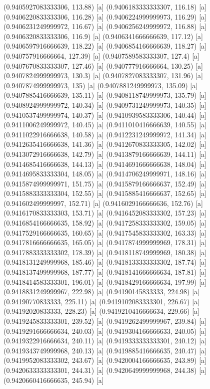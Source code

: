 {{{(0.9405927083333306, 113.88) [a] 
(0.9406183333333307, 116.18) [a] 
(0.9406220833333306, 116.28) [a] 
(0.9406224999999973, 116.29) [a] 
(0.9406231249999972, 116.67) [a] 
(0.9406256249999972, 116.88) [a] 
(0.9406320833333306, 116.9) [a] 
(0.9406341666666639, 117.12) [a] 
(0.9406597916666639, 118.22) [a] 
(0.9406854166666639, 118.27) [a] 
(0.940757916666664, 127.39) [a] 
(0.9407589583333307, 127.4) [a] 
(0.9407670833333307, 127.46) [a] 
(0.940777916666664, 130.25) [a] 
(0.9407824999999973, 130.3) [a] 
(0.9407827083333307, 131.96) [a] 
(0.9407874999999973, 135) [a] 
(0.9407881249999973, 135.09) [a] 
(0.9407885416666639, 135.11) [a] 
(0.9408118749999973, 135.79) [a] 
(0.9408924999999972, 140.34) [a] 
(0.9409731249999973, 140.35) [a] 
(0.9410537499999974, 140.37) [a] 
(0.9410939583333306, 140.44) [a] 
(0.9411006249999972, 140.45) [a] 
(0.9411010416666639, 140.55) [a] 
(0.9411022916666638, 140.58) [a] 
(0.9412231249999972, 141.34) [a] 
(0.9412635416666638, 141.36) [a] 
(0.9412670833333305, 142.02) [a] 
(0.9413072916666638, 142.79) [a] 
(0.9413879166666639, 144.11) [a] 
(0.9414685416666638, 144.13) [a] 
(0.9414691666666638, 148.04) [a] 
(0.9414695833333304, 148.05) [a] 
(0.9414706249999971, 148.16) [a] 
(0.9415874999999971, 151.75) [a] 
(0.9415879166666637, 152.49) [a] 
(0.9415883333333304, 152.55) [a] 
(0.9415885416666637, 152.65) [a] 
(0.941602499999997, 152.71) [a] 
(0.9416029166666636, 152.76) [a] 
(0.9416170833333303, 153.71) [a] 
(0.9416452083333302, 157.23) [a] 
(0.9416854166666635, 158.92) [a] 
(0.9417258333333302, 159.05) [a] 
(0.9417529166666635, 160.65) [a] 
(0.9417545833333302, 163.33) [a] 
(0.9417816666666635, 165.05) [a] 
(0.9417874999999969, 178.31) [a] 
(0.9417883333333302, 178.39) [a] 
(0.9418118749999969, 180.38) [a] 
(0.9418131249999968, 185.46) [a] 
(0.9418133333333302, 187.74) [a] 
(0.9418137499999968, 187.77) [a] 
(0.9418141666666634, 187.81) [a] 
(0.9418414583333301, 196.01) [a] 
(0.9418429166666634, 197.99) [a] 
(0.9418831249999967, 222.98) [a] 
(0.94190145833333, 224.98) [a] 
(0.94190770833333, 225.11) [a] 
(0.9419102083333301, 226.67) [a] 
(0.94192020833333, 228.23) [a] 
(0.9419210416666634, 229.66) [a] 
(0.9419245833333301, 239.52) [a] 
(0.9419262499999967, 239.84) [a] 
(0.9419291666666634, 240.03) [a] 
(0.9419304166666633, 240.05) [a] 
(0.9419322916666634, 240.11) [a] 
(0.9419333333333301, 240.12) [a] 
(0.9419343749999968, 240.13) [a] 
(0.9419885416666635, 240.47) [a] 
(0.9419952083333302, 243.67) [a] 
(0.9420004166666635, 243.89) [a] 
(0.9420633333333301, 244.31) [a] 
(0.9420649999999968, 244.38) [a] 
(0.9420660416666635, 245.94) [a] 
}}}
